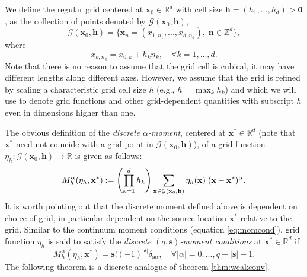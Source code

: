 We define the regular grid centered at $\mathbf x_0\in\mathbb R^d$ with cell size $\mathbf h = (h_1,...,h_d)>\mathbf 0$, as the collection of points denoted by $\mathcal G(\mathbf x_0,\mathbf h)$,
\[
	\mathcal G(\mathbf x_0,\mathbf h) = \{ \mathbf x_n = (x_{1,n_1},...,x_{d,n_d}), \; \mathbf n \in\mathbb Z^d\},
\]
where
\[
	x_{k,n_k} = x_{0,k} + h_kn_k, \quad \forall k=1,...,d.
\]
Note that there is no reason to assume that the grid cell is cubical, it may have different lengths along different axes.
However, we assume that the grid is refined by scaling a characteristic grid cell size $h$ (e.g., $h=\max_{k} h_k$) and which we will use to denote grid functions and other grid-dependent quantities with subscript $h$ even in dimensions higher than one.

The obvious definition of the \emph{discrete $\alpha$-moment}, centered at $\mathbf x^*\in\mathbb R^d$ (note that $\mathbf x^*$ need not coincide with a grid point in $\mathcal G(\mathbf x_0,\mathbf h)$), of a grid function $\eta_h:\mathcal G(\mathbf x_0,\mathbf h)\to \mathbb R$ is given as follows: 
\begin{equation*}\label{eq:def_discmom}
        M_h^\alpha(\eta_h,\mathbf x^*) := \left(\prod_{k=1}^{d} h_k \right) \sum_{\mathbf x\in\mathcal G(\mathbf x_0,\mathbf h)}  \eta_h(\mathbf x)\; ({\bf x}-{\bf x}^*)^{\alpha}.
\end{equation*}
It is worth pointing out that the discrete moment defined above is dependent on choice of grid, in particular dependent on the source location $\mathbf x^*$ relative to the grid.
Similar to the continuum moment conditions (equation \ref{eq:momcond}), grid function $\eta_h$ is said to satisfy the \emph{discrete $(q,\mathbf s)$-moment conditions} at $\mathbf x^*\in\mathbb R^d$ if
\begin{equation}\label{eq:discmomcond}
	M_h^\alpha(\eta_h,\mathbf x^*) = \mathbf s! (-1)^{|\mathbf s|} \delta_{\mathbf s \alpha}, \quad \forall |\alpha|=0,...,q+|\mathbf s|-1.
\end{equation}
The following theorem is a discrete analogue of theorem \ref{thm:weakconv}.

